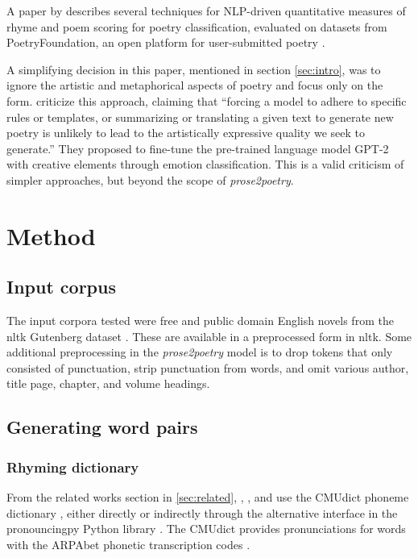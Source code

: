 \documentclass[11pt,a4paper]{article}
\begin{document}
A paper by \citet{keswarani} describes several techniques for NLP-driven quantitative measures of rhyme and poem scoring for poetry classification, evaluated on datasets from PoetryFoundation, an open platform for user-submitted poetry \cite*{poetryfoundation}.

A simplifying decision in this paper, mentioned in section \ref{sec:intro}, was to ignore the artistic and metaphorical aspects of poetry and focus only on the form. \citet{bena2020introducing} criticize this approach, claiming that ``forcing a model to adhere to specific rules or templates, or summarizing or translating a given text to generate new poetry is unlikely to lead to the artistically expressive quality we seek to generate.'' They proposed to fine-tune the pre-trained language model GPT-2 with creative elements through emotion classification. This is a valid criticism of simpler approaches, but beyond the scope of \textit{prose2poetry}.

\section{Method}
\label{sec:method}

\subsection{Input corpus}

The input corpora tested were free and public domain English novels from the nltk Gutenberg dataset \cite[Chapter~2]{gutenbergnltk}. These are available in a preprocessed form in nltk. Some additional preprocessing in the \textit{prose2poetry} model is to drop tokens that only consisted of punctuation, strip punctuation from words, and omit various author, title page, chapter, and volume headings.

\subsection{Generating word pairs}

\subsubsection{Rhyming dictionary}

From the related works section in \ref{sec:related}, \citet{keswarani}, \citet{cole}, and \citet{hopkins-kiela-2017} use the CMUdict phoneme dictionary \cite{cmudict}, either directly or indirectly through the alternative interface in the pronouncingpy Python library \cite{pronouncingpy}. The CMUdict provides pronunciations for words with the ARPAbet phonetic transcription codes \cite[Chapter~27]{jurafsky}.
\end{document}
